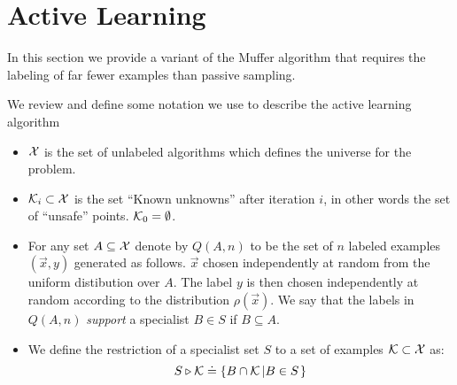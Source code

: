 \documentclass{article}
\newcommand{\X}{{\cal X}}
\newcommand{\x}{\vec{x}}
\newcommand{\K}{{\cal K}}
\newcommand{\restrictedto}{\triangleright}
\begin{document}
\section{Active Learning}

In this section we provide a variant of the Muffer algorithm that
requires the labeling of far fewer examples than passive sampling.

We review and define some notation we use to describe the active learning algorithm

\begin{itemize}
\item $\X$ is the set of unlabeled algorithms which defines the
  universe for the problem.
\item $\K_i \subset \X$ is the set ``Known unknowns'' after iteration $i$, in
  other words the set of ``unsafe'' points. $\K_0=\emptyset$.
\item For any set $A\subseteq \X$ denote by $Q(A,n)$ to be the set of
  $n$ labeled examples $(\x,y)$ generated as follows. $\x$ chosen
  independently at random from the uniform distibution over
  $A$. The label $y$ is then chosen independently at random according
  to the distribution $\rho(\x)$. We say that the
  labels in $Q(A,n)$ {\em support} a specialist $B \in S$ if $B
  \subseteq A$.
\item We define the restriction of a specialist set $S$ to a set of
  examples $\K \subset \X$ as:
  $$
  S \restrictedto \K \doteq \left\{ B \cap \K \left| B \in S \right. \right\}
  $$
\end{itemize}
\end{document}
